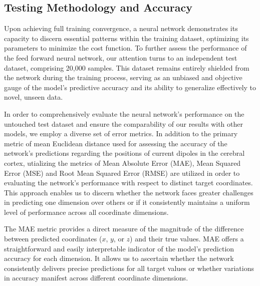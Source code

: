 \documentclass[a4paper, UKenglish, 11pt]{uiomaster}
\begin{document}
\subsection{Testing Methodology and Accuracy}
Upon achieving full training convergence, a neural network demonstrates its capacity to discern essential patterns within the training dataset, optimizing its parameters to minimize the cost function. To further assess the performance of the feed forward neural network, our attention turns to an independent test dataset, comprising 20,000 samples. This dataset remains entirely shielded from the network during the training process, serving as an unbiased and objective gauge of the model's predictive accuracy and its ability to generalize effectively to novel, unseen data.

In order to comprehensively evaluate the neural network's performance on the untouched test dataset and ensure the comparability of our results with other models, we employ a diverse set of error metrics. In addition to the primary metric of mean Euclidean distance used for assessing the accuracy of the network's predictions regarding the positions of current dipoles in the cerebral cortex, utializing the metrics of Mean Absolute Error (MAE), Mean Squared Error (MSE) and Root Mean Squared Error (RMSE) are utilized in order to evaluating the network's performance with respect to distinct target coordinates. This approach enables us to discern whether the network faces greater challenges in predicting one dimension over others or if it consistently maintains a uniform level of performance across all coordinate dimensions.

The MAE metric provides a direct measure of the magnitude of the difference between predicted coordinates ($x$, $y$, or $z$) and their true values. MAE offers a straightforward and easily interpretable indicator of the model's prediction accuracy for each dimension. It allows us to ascertain whether the network consistently delivers precise predictions for all target values or whether variations in accuracy manifest across different coordinate dimensions.
\end{document}
